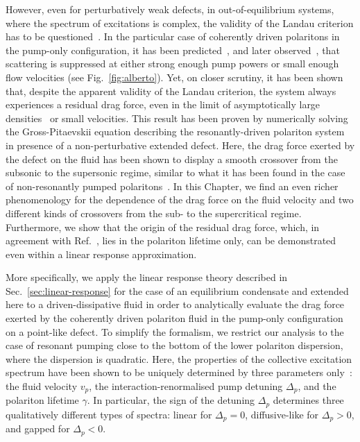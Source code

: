 However, even for perturbatively weak defects, in out-of-equilibrium
systems, where the spectrum of excitations is complex, the validity of
the Landau criterion has to be
questioned~\cite{Szyma_ska_2006,Wouters_2010,Cancellieri_2010}. In the
particular case of coherently driven polaritons in the pump-only
configuration, it has been predicted~\cite{Carusotto_2004,Ciuti_2005},
and later observed~\cite{Amo_2009}, that scattering is suppressed at
either strong enough pump powers or small enough flow velocities (see
Fig.~\ref{fig:alberto}). Yet, on closer scrutiny, it has been shown
that, despite the apparent validity of the Landau criterion, the
system always experiences a residual drag force, even in the limit of
asymptotically large densities~\cite{Cancellieri_2010} or small
velocities. This result has been proven by numerically solving the
Gross-Pitaevskii equation describing the resonantly-driven polariton
system in presence of a non-perturbative extended defect. Here, the
drag force exerted by the defect on the fluid has been shown to
display a smooth crossover from the subsonic to the supersonic regime,
similar to what it has been found in the case of non-resonantly pumped
polaritons~\cite{Wouters_2010}. In this Chapter, we find an even
richer phenomenology for the dependence of the drag force on the fluid
velocity and two different kinds of crossovers from the sub- to the
supercritical regime. Furthermore, we show that the origin of the
residual drag force, which, in agreement with
Ref.~\cite{Cancellieri_2010}, lies in the polariton lifetime only, can
be demonstrated even within a linear response approximation.

More specifically, we apply the linear response theory described in
Sec.~\ref{sec:linear-response} for the case of an equilibrium
condensate and extended here to a driven-dissipative fluid in order to
analytically evaluate the drag force exerted by the coherently driven
polariton fluid in the pump-only configuration on a point-like
defect. To simplify the formalism, we restrict our analysis to the
case of resonant pumping close to the bottom of the lower polariton
dispersion, where the dispersion is quadratic. Here, the properties of
the collective excitation spectrum have been shown to be uniquely
determined by three parameters only~\cite{Ciuti_2005}: the fluid
velocity $v_p$, the interaction-renormalised pump detuning $\Delta_p$,
and the polariton lifetime $\gamma$. In particular, the sign of the
detuning $\Delta_p$ determines three qualitatively different types of
spectra: linear for $\Delta_p= 0$, diffusive-like for $\Delta_p> 0$,
and gapped for $\Delta_p< 0$.

